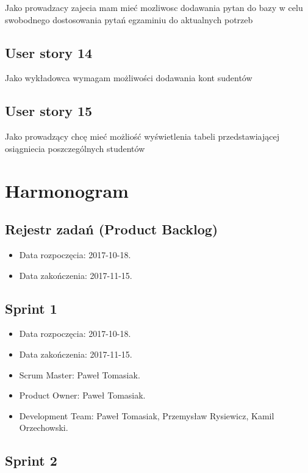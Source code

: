 \documentclass[a4paper]{article}
\begin{document}
Jako prowadzacy zajecia mam mieć mozliwosc dodawania pytan do bazy w celu swobodnego dostosowania pytań egzaminiu do aktualnych potrzeb

\subsection{User story 14}

Jako wykładowca wymagam możliwości dodawania kont sudentów

\subsection{User story 15}

Jako prowadzący chcę mieć możliość wyświetlenia tabeli przedstawiającej osiągniecia poszczególnych studentów

\section{Harmonogram}

\subsection{Rejestr zadań (Product Backlog)}

\begin{itemize}
\item Data rozpoczęcia: 2017-10-18.
\item  Data zakończenia: 2017-11-15.
\end{itemize}

\subsection{Sprint 1}

\begin{itemize}
\item Data rozpoczęcia: 2017-10-18.
\item Data zakończenia: 2017-11-15.
\item Scrum Master: Paweł Tomasiak.
\item Product Owner: Paweł Tomasiak.
\item Development Team: Paweł Tomasiak, Przemysław Rysiewicz, Kamil Orzechowski.
\end{itemize}

\subsection{Sprint 2}
\end{document}
